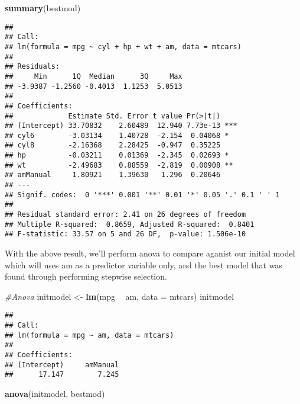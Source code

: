 \documentclass[
]{article}
\newenvironment{Shaded}{\begin{snugshade}}{\end{snugshade}}
\newcommand{\CommentTok}[1]{\textcolor[rgb]{0.56,0.35,0.01}{\textit{#1}}}
\newcommand{\DataTypeTok}[1]{\textcolor[rgb]{0.13,0.29,0.53}{#1}}
\newcommand{\KeywordTok}[1]{\textcolor[rgb]{0.13,0.29,0.53}{\textbf{#1}}}
\newcommand{\NormalTok}[1]{#1}
\newcommand{\OperatorTok}[1]{\textcolor[rgb]{0.81,0.36,0.00}{\textbf{#1}}}
\newcommand{\StringTok}[1]{\textcolor[rgb]{0.31,0.60,0.02}{#1}}
\begin{document}
\begin{Shaded}
\begin{Highlighting}[]
\KeywordTok{summary}\NormalTok{(bestmod)}
\end{Highlighting}
\end{Shaded}

\begin{verbatim}
## 
## Call:
## lm(formula = mpg ~ cyl + hp + wt + am, data = mtcars)
## 
## Residuals:
##     Min      1Q  Median      3Q     Max 
## -3.9387 -1.2560 -0.4013  1.1253  5.0513 
## 
## Coefficients:
##             Estimate Std. Error t value Pr(>|t|)    
## (Intercept) 33.70832    2.60489  12.940 7.73e-13 ***
## cyl6        -3.03134    1.40728  -2.154  0.04068 *  
## cyl8        -2.16368    2.28425  -0.947  0.35225    
## hp          -0.03211    0.01369  -2.345  0.02693 *  
## wt          -2.49683    0.88559  -2.819  0.00908 ** 
## amManual     1.80921    1.39630   1.296  0.20646    
## ---
## Signif. codes:  0 '***' 0.001 '**' 0.01 '*' 0.05 '.' 0.1 ' ' 1
## 
## Residual standard error: 2.41 on 26 degrees of freedom
## Multiple R-squared:  0.8659, Adjusted R-squared:  0.8401 
## F-statistic: 33.57 on 5 and 26 DF,  p-value: 1.506e-10
\end{verbatim}

With the above result, we'll perform anova to compare aganist our
initial model which will uses am as a predictor variable only, and the
best model that was found through performing stepwise selection.

\begin{Shaded}
\begin{Highlighting}[]
\CommentTok{#Anova}
\NormalTok{initmodel <-}\StringTok{ }\KeywordTok{lm}\NormalTok{(mpg }\OperatorTok{~}\StringTok{ }\NormalTok{am, }\DataTypeTok{data =}\NormalTok{ mtcars)}
\NormalTok{initmodel}
\end{Highlighting}
\end{Shaded}

\begin{verbatim}
## 
## Call:
## lm(formula = mpg ~ am, data = mtcars)
## 
## Coefficients:
## (Intercept)     amManual  
##      17.147        7.245
\end{verbatim}

\begin{Shaded}
\begin{Highlighting}[]
\KeywordTok{anova}\NormalTok{(initmodel, bestmod)}
\end{Highlighting}
\end{Shaded}
\end{document}
